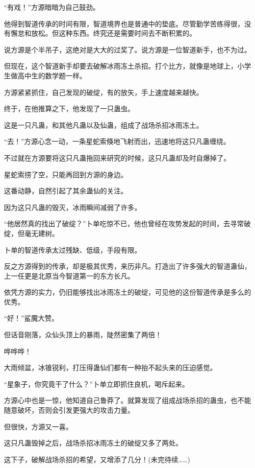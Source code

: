 \begin{this_body}
“有戏！”方源暗暗为自己鼓劲。

他得到智道传承的时间有限，智道境界也是普通中的垫底。尽管勤学苦练得很，没有懈怠和放松。但这种东西。终究还是需要时间去不断积累的。

说方源是个半吊子，这绝对是大大的过奖了。说方源是一位智道新手，也不为过。

但现在，这个智道新手却要去破解冰雨冻土杀招。打个比方，就像是地球上，小学生做高中生的数学题一样。

方源紧紧抓住，自己发现的破绽，有的放矢，手上速度越来越快。

终于，在他推算之下，他发现了一只蛊虫。

这是一只凡蛊，和其他凡蛊以及仙蛊，组成了战场杀招冰雨冻土。

“去！”方源心念一动，一条星蛇索倏地飞射而出，迅速地将这只凡蛊缠绕。

不过就在方源要将这只凡蛊拖回来研究的时候，这只凡蛊却及时自爆掉了。

星蛇索捞了空，只能再回到方源的身边。

这番动静，自然引起了其余蛊仙的关注。

因为这只凡蛊的毁灭，冰雨瞬间减弱了许多。

“他居然真的找出了破绽？”卜单吃惊不已，他也曾经在攻势发起的时间，去寻常破绽，但毫无建树。

卜单的智道传承太过残缺、低级，手段有限。

反之方源得到的传承，却是极其优秀，来历非凡。打造出了许多强大的智道蛊仙，上一任更是北原当今智道第一的东方长凡。

依凭方源的实力，仍旧能够找出冰雨冻土的破绽，可见他的这份智道传承是多么的优秀。

“好！”鲨魔大赞。

但话音刚落，众仙头顶上的暴雨，陡然密集了两倍！

哗哗哗！

大雨倾盆，冰锥锐利，打压得蛊仙们都有一种抬不起头来的压迫感觉。

“星象子，你究竟干了什么？”卜单立即抓住良机，喝斥起来。

方源心中也是一惊，他知道自己鲁莽了。就算发现了组成战场杀招的蛊虫，也不能随意破坏，否则会引发更强大的攻击力量。

但很快，方源又一喜。

这只凡蛊毁掉之后，战场杀招冰雨冻土的破绽又多了两处。

这下子，破解战场杀招的希望，又增添了几分！(未完待续……)

\end{this_body}

